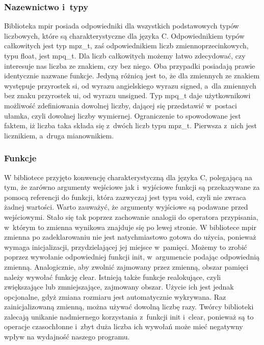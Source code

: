 \subsubsection{Nazewnictwo i~typy}

Biblioteka mpir posiada odpowiedniki dla wszystkich podstawowych typów liczbowych, które są charakterystyczne dla języka C. Odpowiednikiem typów całkowitych jest typ mpz\_t, zaś odpowiednikiem liczb zmiennoprzecinkowych, typu float, jest mpq\_t. Dla liczb całkowitych możemy łatwo zdecydować, czy interesuje nas liczba ze znakiem, czy bez niego. Oba przypadki posiadają prawie identycznie nazwane funkcje. Jedyną różnicą jest to, że dla zmiennych ze znakiem występuje przyrostek si, od wyrazu angielskiego wyrazu signed, a~dla zmiennych bez znaku przyrostek ui, od wyrazu unsigned. Typ mpq\_t daje użytkownikowi możliwość zdefiniowania dowolnej liczby, dającej się przedstawić w~postaci ułamka, czyli dowolnej liczby wymiernej. Ograniczenie to spowodowane jest faktem, iż liczba taka składa się z~dwóch liczb typu mpz\_t. Pierwsza z~nich jest licznikiem, a~druga mianownikiem.

\subsubsection{Funkcje}
W bibliotece przyjęto konwencję charakterystyczną dla języka C, polegającą na tym, że zarówno argumenty wejściowe jak i~wyjściowe funkcji są przekazywane za pomocą referencji do funkcji, która zazwyczaj jest typu void, czyli nie zwraca żadnej wartości. Warto zauważyć, że argumenty wyjściowe są podawane przed wejściowymi. Stało się tak poprzez zachowanie analogii do operatora przypisania, w~którym to zmienna wynikowa znajduje się po lewej stronie.
W bibliotece mpir zmienna po zadeklarowaniu nie jest natychmiastowo gotowa do użycia, ponieważ wymaga inicjalizacji, przydzielającej jej miejsce w~pamięci. Możemy to zrobić poprzez wywołanie odpowiedniej funkcji init, w~argumencie podając odpowiednią zmienną. Analogicznie, aby zwolnić zajmowany przez zmienną, obszar pamięci należy wywołać funkcję clear. Istnieją także funkcje realokujące, czyli zwiększające lub zmniejszające, zajmowany obszar. Użycie ich jest jednak opcjonalne, gdyż zmiana rozmiaru jest automatycznie wykrywana. Raz zainicjalizowaną zmienną, można używać dowolną liczbę razy. Twórcy biblioteki zalecają unikanie nadmiernego korzystania z~funkcji init i~clear, ponieważ są to operacje czasochłonne i~zbyt duża liczba ich wywołań może mieć negatywny wpływ na wydajność naszego programu.

